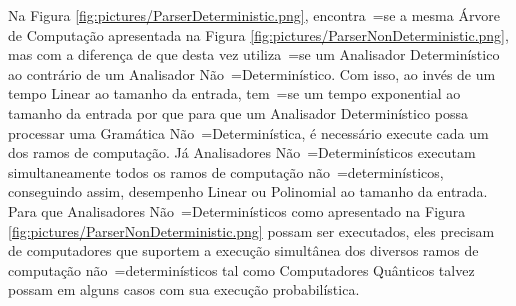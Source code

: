 {    Na Figura \ref{fig:pictures/ParserDeterministic.png},
    encontra~=se a mesma Árvore de Computação apresentada na
    Figura \ref{fig:pictures/ParserNonDeterministic.png},
    mas com a diferença de que desta vez utiliza~=se um Analisador
    Determinístico ao contrário de um Analisador Não~=Determinístico.
    Com isso,
    ao invés de um tempo Linear ao tamanho da entrada,
    tem~=se um tempo exponential ao tamanho da entrada por que para que um
    Analisador Determinístico possa processar uma Gramática Não~=Determinística,
    é necessário execute cada um dos ramos de computação.
    Já Analisadores Não~=Determinísticos executam simultaneamente
    todos os ramos de computação não~=determinísticos,
    conseguindo assim,
    desempenho Linear ou Polinomial ao tamanho da entrada.
    Para que Analisadores Não~=Determinísticos como apresentado na Figura
    \ref{fig:pictures/ParserNonDeterministic.png} possam ser executados,
    eles precisam de computadores que suportem a execução simultânea dos diversos
    ramos de computação não~=determinísticos tal como Computadores Quânticos
    talvez possam em alguns casos com sua execução probabilística.
}

